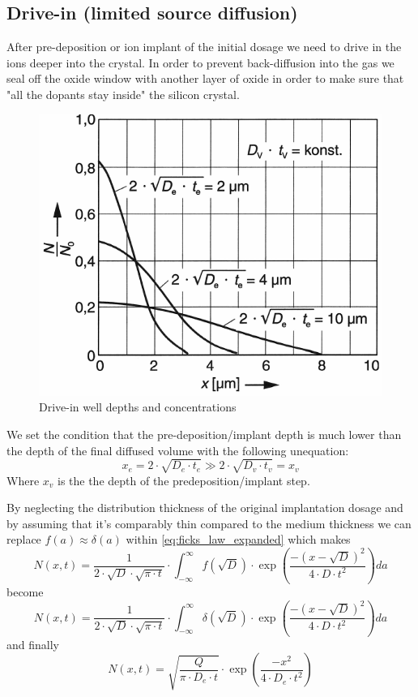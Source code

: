\subsection{Drive-in (limited source diffusion)}
After pre-deposition or ion implant of the initial dosage we need to drive in the ions deeper into the crystal.
In order to prevent back-diffusion into the gas we seal off the oxide window with another layer of oxide in order to make sure that "all the dopants stay inside" the silicon crystal.

\begin{figure}[H]
	\centering
	\includegraphics[scale=0.5]{dopants_drive_in_depth.png}
	\caption{Drive-in well depths and concentrations}
\end{figure}

We set the condition that the pre-deposition/implant depth is much lower than the depth of the final diffused volume with the following unequation:
\begin{equation}
x_e = 2 \cdot \sqrt{D_e \cdot t_e} \gg 2 \cdot \sqrt{D_v \cdot t_v} = x_v
\end{equation}
Where $x_v$ is the the depth of the predeposition/implant step.

By neglecting the distribution thickness of the original implantation dosage and by assuming that it's comparably thin compared to the medium thickness we can replace  $f(a) \approx \delta(a)$ within \autoref{eq:ficks_law_expanded} which makes
\begin{equation}
N(x,t) = \frac{1}{2 \cdot \sqrt{D} \cdot \sqrt{\pi \cdot t}} \cdot \int_{-\infty}^{\infty}{f(\sqrt{D})\cdot\exp\left(\frac{-(x-\sqrt{D})^2}{4 \cdot D \cdot t^2}\right)}da
\end{equation}
become
\begin{equation}
N(x,t)
=
\frac{1}{2 \cdot \sqrt{D} \cdot \sqrt{\pi \cdot t}} \cdot \int_{-\infty}^{\infty}{\delta(\sqrt{D})\cdot\exp\left(\frac{-(x-\sqrt{D})^2}{4 \cdot D \cdot t^2}\right)}da
\end{equation}
and finally
\begin{equation}
N(x,t)
=
\sqrt{\frac{Q}{\pi \cdot D_e \cdot t}} \cdot \exp\left(\frac{-x^2}{4 \cdot D_e \cdot t^2}\right)
\end{equation}